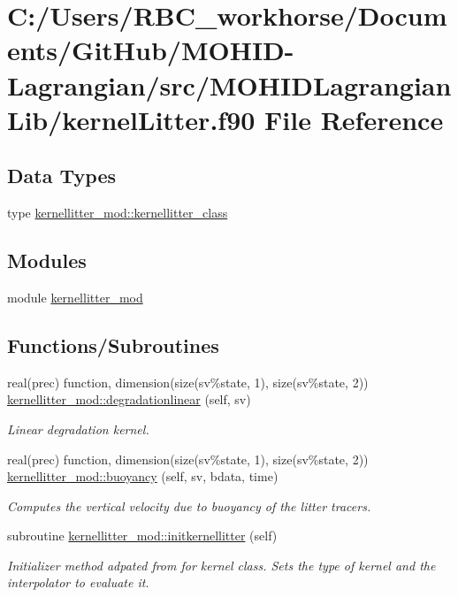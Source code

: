 \hypertarget{kernel_litter_8f90}{}\section{C\+:/\+Users/\+R\+B\+C\+\_\+workhorse/\+Documents/\+Git\+Hub/\+M\+O\+H\+I\+D-\/\+Lagrangian/src/\+M\+O\+H\+I\+D\+Lagrangian\+Lib/kernel\+Litter.f90 File Reference}
\label{kernel_litter_8f90}
\subsection*{Data Types}
\begin{DoxyCompactItemize}
\item 
type \mbox{\hyperlink{structkernellitter__mod_1_1kernellitter__class}{kernellitter\+\_\+mod\+::kernellitter\+\_\+class}}
\end{DoxyCompactItemize}
\subsection*{Modules}
\begin{DoxyCompactItemize}
\item 
module \mbox{\hyperlink{namespacekernellitter__mod}{kernellitter\+\_\+mod}}
\end{DoxyCompactItemize}
\subsection*{Functions/\+Subroutines}
\begin{DoxyCompactItemize}
\item 
real(prec) function, dimension(size(sv\%state, 1), size(sv\%state, 2)) \mbox{\hyperlink{namespacekernellitter__mod_ab3201eb9917816dbd1043be44120efcb}{kernellitter\+\_\+mod\+::degradationlinear}} (self, sv)
\begin{DoxyCompactList}\small\item\em Linear degradation kernel. \end{DoxyCompactList}\item 
real(prec) function, dimension(size(sv\%state, 1), size(sv\%state, 2)) \mbox{\hyperlink{namespacekernellitter__mod_a6dfc58ed5badd008180abb729e1bca82}{kernellitter\+\_\+mod\+::buoyancy}} (self, sv, bdata, time)
\begin{DoxyCompactList}\small\item\em Computes the vertical velocity due to buoyancy of the litter tracers. \end{DoxyCompactList}\item 
subroutine \mbox{\hyperlink{namespacekernellitter__mod_a145c58d91c7654c5c4f8beac04b608b6}{kernellitter\+\_\+mod\+::initkernellitter}} (self)
\begin{DoxyCompactList}\small\item\em Initializer method adpated from for kernel class. Sets the type of kernel and the interpolator to evaluate it. \end{DoxyCompactList}\end{DoxyCompactItemize}
